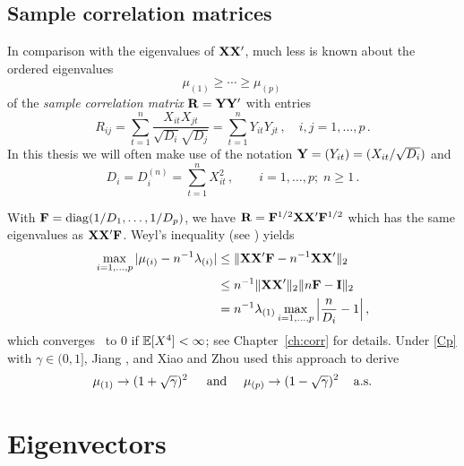 \subsection{Sample correlation matrices}

In comparison with the eigenvalues of ${\mathbf X}{\mathbf X}'$, much less is known about the ordered eigenvalues
\begin{equation*}
\mu_{(1)} \ge \cdots \ge\mu_{(p)}\,
\end{equation*} 
of the {\em sample correlation matrix} ${\mathbf R}={\mathbf Y}{\mathbf Y}'$ with entries
\begin{equation}\label{eq:corrRch1}
R_{ij}=\sum_{t=1}^n \frac{X_{it}X_{jt}}{\sqrt{D_i} \sqrt{D_j}} = \sum_{t=1}^n Y_{it}Y_{jt}\,, \quad i,j=1,\ldots,p\,.
\end{equation}
In this thesis we will often make use of the notation ${\mathbf Y}=(Y_{it})=(X_{it}/\sqrt{D_i})$ and
\begin{equation}\label{eq:Dch1}
D_i=D_i^{(n)}=\sum_{t=1}^n X_{it}^2\,, \qquad
i=1,\ldots,p;\;  n\ge 1\,.
\end{equation} 

With ${\mathbf F}= \operatorname{diag} (1/D_1,\ldots,1/D_p)$, we have ${\mathbf R}={{\mathbf F}}^{1/2} {{\mathbf X}}{{\mathbf X}}'{{\mathbf F}}^{1/2}$ which has the same eigenvalues as ${{\mathbf X}}{{\mathbf X}}'{{\mathbf F}}$. Weyl's inequality (see \cite{bhatia:1997}) yields
\begin{equation}\label{eq:lamuch1}
\begin{split}
\max_{i=1,\ldots,p} |\mu_{(i)}- n^{-1} \lambda_{(i)}| &\le \|{{\mathbf X}}{{\mathbf X}}'{{\mathbf F}}-n^{-1}{{\mathbf X}}{{\mathbf X}}' \|_2\\
&\le n^{-1} \|{{\mathbf X}}{{\mathbf X}}'\|_2  \|n {\mathbf F}- {\mathbf I}\|_2\\
&= n^{-1} \lambda_{(1)} \max_{i=1,\ldots,p} \Big| \frac{n}{D_i} -1 \Big|\,,
\end{split}
\end{equation}
which converges \as~to $0$ if $\mathbb{E}[X^4]<\infty$; see Chapter~\ref{ch:corr} for details.
Under \eqref{Cp} with $\gamma\in(0,1]$,  Jiang \cite{jiang:2004}, and Xiao and Zhou \cite{xiao:zhou:2010} used this approach to derive 
\begin{equation*}
\mu_{(1)} \to (1+\sqrt{\gamma})^2\, \quad \text{ and } \quad  \mu_{(p)} \to (1-\sqrt{\gamma})^2\, \quad {\rm a.s.}
\end{equation*}



\section{Eigenvectors}

